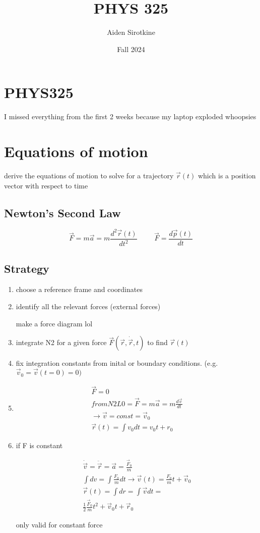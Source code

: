 \documentclass[fleqn]{report}
\date{Fall 2024}
\title{PHYS 325}
\author{Aiden Sirotkine}
\newcommand{\hp}{\hspace{1cm}}
\newcommand{\equations} [1] {
\begin{gather*}
#1
\end{gather*}
}
\begin{document}
\pagestyle{fancy}
\maketitle
\tableofcontents
\clearpage

\chapter{PHYS325}
I missed everything from the first 2 weeks because my laptop exploded whoopsies

\chapter{Equations of motion}
derive the equations of motion to solve for a trajectory $\vec r(t)$ which is a position vector 
with respect to time

\section{Newton's Second Law}
\[
\vec F = m \vec a = m \frac{d^2 \vec r(t)}{dt^2} 
\hp
\vec F = \frac{d \vec p(t)}{dt}
\]

\section{Strategy}
\begin{enumerate}
\item
choose a reference frame and coordinates
\item identify all the relevant forces (external forces)

make a force diagram lol
\item
integrate N2 for a given force $\vec F(\vec r, \dot \vec r, t)$ to
find $\vec r(t)$
\item
fix integration constants from inital or boundary conditions. 
(e.g. $\vec v_0 = \vec v(t = 0) = 0)$ 

\item 
\equations{
\vec F = 0
\\
from N2L 0 = \vec F = m \vec a = m \frac{d \vec v}{dt}
\\
\rightarrow \vec v =  const = \vec v_0
\\
\vec r(t) = \int v_0 dt = v_0 t + r_0
}
\item
if F is constant
\equations{
\dot \vec v = \ddot \vec r = \vec a = \frac{\vec F_0}{m}
\\
\int dv = \int \frac{F_0}{m} dt \rightarrow \vec v(t) = 
\frac{F_0}{m} t + \vec v_0
\\
\vec r(t) = \int dr = \int \vec v dt =
\\
\frac{1}{2} \frac{\vec F_0}{m} t^2 + \vec v_0 t + \vec r_0
}

only valid for constant force
\end{enumerate}
\end{document}
